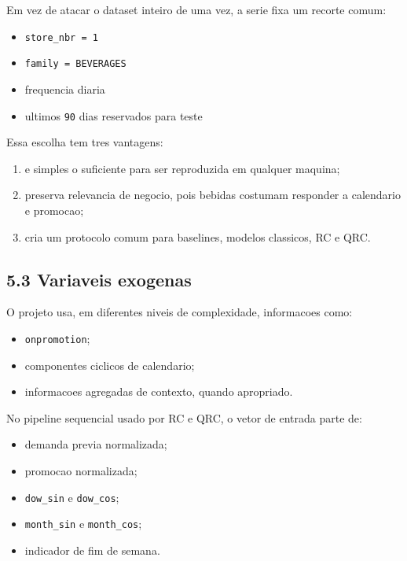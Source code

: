 \documentclass[12pt]{article}
\providecommand{\tightlist}{%
  \setlength{\itemsep}{0pt}\setlength{\parskip}{0pt}}
\begin{document}
Em vez de atacar o dataset inteiro de uma vez, a serie fixa um recorte comum:

\begin{itemize}
\tightlist
\item
  \texttt{store\_nbr\ =\ 1}
\item
  \texttt{family\ =\ BEVERAGES}
\item
  frequencia diaria
\item
  ultimos \texttt{90} dias reservados para teste
\end{itemize}

Essa escolha tem tres vantagens:

\begin{enumerate}
\def\labelenumi{\arabic{enumi}.}
\tightlist
\item
  e simples o suficiente para ser reproduzida em qualquer maquina;
\item
  preserva relevancia de negocio, pois bebidas costumam responder a calendario e promocao;
\item
  cria um protocolo comum para baselines, modelos classicos, RC e QRC.
\end{enumerate}

\subsection{5.3 Variaveis exogenas}\label{53-variaveis-exogenas}

O projeto usa, em diferentes niveis de complexidade, informacoes como:

\begin{itemize}
\tightlist
\item
  \texttt{onpromotion};
\item
  componentes ciclicos de calendario;
\item
  informacoes agregadas de contexto, quando apropriado.
\end{itemize}

No pipeline sequencial usado por RC e QRC, o vetor de entrada parte de:

\begin{itemize}
\tightlist
\item
  demanda previa normalizada;
\item
  promocao normalizada;
\item
  \texttt{dow\_sin} e \texttt{dow\_cos};
\item
  \texttt{month\_sin} e \texttt{month\_cos};
\item
  indicador de fim de semana.
\end{itemize}
\end{document}
